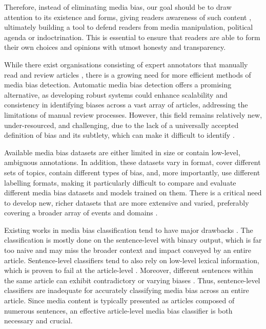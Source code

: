 Therefore, instead of eliminating media bias, our goal should be to draw attention to its existence and forms, giving readers awareness of such content \cite{spinde-2024-taxonomy}, ultimately building a tool to defend readers from media manipulation, political agenda or indoctrination. This is essential to ensure that readers are able to form their own choices and opinions with utmost honesty and transparency.


While there exist organisations consisting of expert annotators that manually read and review articles \cite{adfontes, allsides, mbfc}, there is a growing need for more efficient methods of media bias detection. Automatic media bias detection offers a promising alternative, as developing robust systems could enhance scalability and consistency in identifying biases across a vast array of articles, addressing the limitations of manual review processes. However, this field remains relatively new, under-resourced, and challenging, due to the lack of a universally accepted definition of bias and its subtlety, which can make it difficult to identify \cite{rodrigo-2024-systematic-review-media-bias}.

Available media bias datasets \cite{spinde-2021-babe,fan-2019-basil,chen-2020-nlpcss,spinde-2023-bat,gruppi-2023-nela-gt-2022} are either limited in size or contain low-level, ambiguous annotations. In addition, these datasets vary in format, cover different sets of topics, contain different types of bias, and, more importantly, use different labelling formats, making it particularly difficult to compare and evaluate different media bias datasets and models trained on them. There is a critical need to develop new, richer datasets that are more extensive and varied, preferably covering a broader array of events and domains \cite{rodrigo-2024-systematic-review-media-bias}.

Existing works in media bias classification tend to have major drawbacks \cite{maab-2023-lexical-bias-detection, maab-2023-target-aware, guo-2022-modeling, van-den-berg-2020-context,lee-2021-unifying,lei-2022-sentence,lei-2024-event-relation}. The classification is mostly done on the sentence-level with binary output, which is far too naive and may miss the broader context and impact conveyed by an entire article. Sentence-level classifiers tend to also rely on low-level lexical information, which is proven to fail at the article-level \cite{chen-2020-detecting-media-bias-gaussian}. Moreover, different sentences within the same article can exhibit contradictory or varying biases \cite{lei-2022-sentence}. Thus, sentence-level classifiers are inadequate for accurately classifying media bias across an entire article. Since media content is typically presented as articles composed of numerous sentences, an effective article-level media bias classifier is both necessary and crucial.

